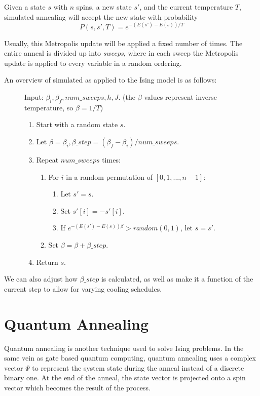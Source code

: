 \documentclass[11pt]{report}
\newcommand{\?}{\stackrel{?}{=}}
\begin{document}
Given a state $s$ with $n$ spins, a new state $s'$, and the current temperature $T$, simulated annealing will accept the new state with probability
$$P(s, s', T) = e^{-(E(s')-E(s))/T}$$

Usually, this Metropolis update will be applied a fixed number of times. The entire anneal is divided up into \textit{sweeps}, where in each sweep the Metropolis update is applied to every variable in a random ordering.

An overview of simulated as applied to the Ising model is as follows:

\begin{figure}[H]
Input: $\beta_i, \beta_f, num\_sweeps, h, J$. (the $\beta$ values represent inverse temperature, so $\beta = 1/T$)
\begin{enumerate}
\item Start with a random state $s$.
\item Let $\beta = \beta_i, \beta\_step = (\beta_f - \beta_i)/num\_sweeps$.
\item Repeat $num\_sweeps$ times:
	\begin{enumerate}
	\item For $i$ in a random permutation of $[0,1,...,n-1]$:
		\begin{enumerate}
		\item Let $s' = s$.
		\item Set $s'[i] = -s'[i]$.
		\item If $e^{-(E(s')-E(s))\beta} > random(0,1)$, let $s = s'$.
		\end{enumerate}
		\item Set $\beta = \beta + \beta\_step$.
	\end{enumerate}
\item Return $s$.
\end{enumerate}
\end{figure}

We can also adjust how $\beta\_step$ is calculated, as well as make it a function of the current step to allow for varying cooling schedules.

\section{Quantum Annealing}

Quantum annealing is another technique used to solve Ising problems. In the same vein as gate based quantum computing, quantum annealing uses a complex vector $\Psi$ to represent the system state during the anneal instead of a discrete binary one. At the end of the anneal, the state vector is projected onto a spin vector which becomes the result of the process.
\end{document}
